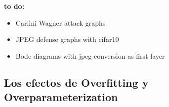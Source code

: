 {\LARGE \textbf{to do:}}
\begin{itemize}
    \item Carlini Wagner attack graphs
    \item JPEG defense graphs with cifar10
    \item Bode diagrams with jpeg conversion as first layer
    
\end{itemize}







\subsection{Los efectos de Overfitting y Overparameterization}

